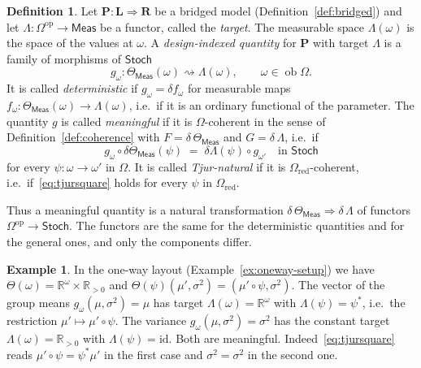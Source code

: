 \documentclass[11pt,a4paper]{article}
\theoremstyle{plain}
\theoremstyle{definition}
\newtheorem{definition}[theorem]{Definition}
\newtheorem{example}[theorem]{Example}
\theoremstyle{remark}
\newcommand{\cat}[1]{\mathsf{#1}}
\newcommand{\catO}{\cat{\Omega}}
\newcommand{\Meas}{\cat{Meas}}
\newcommand{\Stoch}{\cat{Stoch}}
\newcommand{\op}{\mathrm{op}}
\newcommand{\id}{\mathrm{id}}
\newcommand{\del}{\delta}
\newcommand{\R}{\mathbb{R}}
\DeclareMathOperator{\ob}{ob}
\begin{document}
\begin{definition}\label{def:meaningful}
Let $\mathbf{P} \colon \mathbf{L} \Rightarrow \mathbf{R}$ be a bridged model
(Definition~\ref{def:bridged}) and let
$\Lambda \colon \catO^{\op} \to \Meas$ be a functor, called the \emph{target}.
The measurable space $\Lambda(\omega)$ is the space of the values at $\omega$.
A \emph{design-indexed quantity} for $\mathbf P$ with target $\Lambda$ is a
family of morphisms of $\Stoch$
\[
g_{\omega} \colon \Theta_\Meas(\omega) \rightsquigarrow \Lambda(\omega),
\qquad \omega \in \ob\catO .
\]
It is called \emph{deterministic} if $g_{\omega} = \del f_{\omega}$ for
measurable maps
$f_{\omega} \colon \Theta_\Meas(\omega) \to \Lambda(\omega)$, i.e.\ if it is an
ordinary functional of the parameter. The quantity $g$ is called
\emph{meaningful} if it is $\catO$-coherent in the sense of
Definition~\ref{def:coherence} with $F = \del\,\Theta_\Meas$ and
$G = \del\,\Lambda$, i.e.\ if
\begin{equation}\label{eq:tjursquare}
g_{\omega} \circ \del\Theta_\Meas(\psi) \;=\; \del\Lambda(\psi) \circ
g_{\omega'}
\quad\text{in } \Stoch
\end{equation}
for every $\psi \colon \omega \to \omega'$ in $\catO$. It is called
\emph{Tjur-natural} if it is $\catO_{\mathrm{red}}$-coherent, i.e.\
if~\eqref{eq:tjursquare} holds for every $\psi$ in $\catO_{\mathrm{red}}$.
\end{definition}

Thus a meaningful quantity is a natural transformation
$\del\,\Theta_\Meas \Rightarrow \del\,\Lambda$ of functors
$\catO^{\op} \to \Stoch$. The functors are the same for the deterministic
quantities and for the general ones, and only the components differ.

\begin{example}\label{ex:targets}
In the one-way layout (Example~\ref{ex:oneway-setup}) we have
$\Theta(\omega) = \R^{\omega} \times \R_{>0}$ and
$\Theta(\psi)(\mu',\sigma^{2}) = (\mu' \circ \psi, \sigma^{2})$. The vector of
the group means $g_{\omega}(\mu,\sigma^{2}) = \mu$ has target
$\Lambda(\omega) = \R^{\omega}$ with $\Lambda(\psi) = \psi^{*}$, i.e.\ the
restriction $\mu' \mapsto \mu' \circ \psi$. The variance
$g_{\omega}(\mu,\sigma^{2}) = \sigma^{2}$ has the constant target
$\Lambda(\omega) = \R_{>0}$ with $\Lambda(\psi) = \id$. Both are meaningful.
Indeed~\eqref{eq:tjursquare} reads $\mu' \circ \psi = \psi^{*}\mu'$ in the
first case and $\sigma^{2} = \sigma^{2}$ in the second one.
\end{example}
\end{document}
